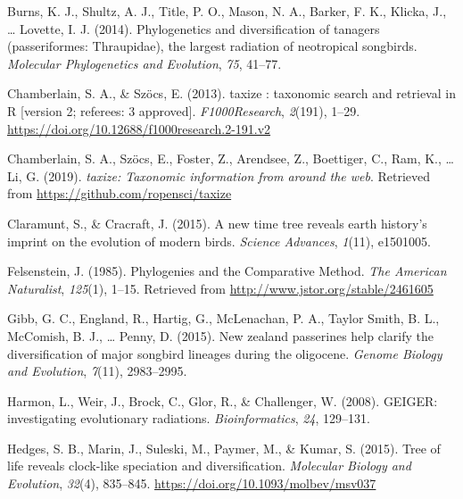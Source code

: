 \documentclass[
  english,
  man]{apa6}
\newlength{\cslhangindent}
\newlength{\cslentryspacingunit} %
\newenvironment{CSLReferences}[2] %
 {%
  \setlength{\parindent}{0pt}
  \ifodd #1
  \let\oldpar\par
  \def\par{\hangindent=\cslhangindent\oldpar}
  \fi
  \setlength{\parskip}{#2\cslentryspacingunit}
 }%
 {}
\begin{document}
\begin{CSLReferences}{1}{0}
\leavevmode{}%
Burns, K. J., Shultz, A. J., Title, P. O., Mason, N. A., Barker, F. K., Klicka, J., \ldots{} Lovette, I. J. (2014). Phylogenetics and diversification of tanagers (passeriformes: Thraupidae), the largest radiation of neotropical songbirds. \emph{Molecular Phylogenetics and Evolution}, \emph{75}, 41--77.

\leavevmode{}%
Chamberlain, S. A., \& Szöcs, E. (2013). {taxize : taxonomic search and retrieval in R {[}version 2; referees: 3 approved{]}}. \emph{F1000Research}, \emph{2}(191), 1--29. \url{https://doi.org/10.12688/f1000research.2-191.v2}

\leavevmode{}%
Chamberlain, S. A., Szöcs, E., Foster, Z., Arendsee, Z., Boettiger, C., Ram, K., \ldots{} Li, G. (2019). \emph{{taxize: Taxonomic information from around the web}}. Retrieved from \url{https://github.com/ropensci/taxize}

\leavevmode{}%
Claramunt, S., \& Cracraft, J. (2015). A new time tree reveals earth history's imprint on the evolution of modern birds. \emph{Science Advances}, \emph{1}(11), e1501005.

\leavevmode{}%
Felsenstein, J. (1985). {Phylogenies and the Comparative Method}. \emph{The American Naturalist}, \emph{125}(1), 1--15. Retrieved from \url{http://www.jstor.org/stable/2461605}

\leavevmode{}%
Gibb, G. C., England, R., Hartig, G., McLenachan, P. A., Taylor Smith, B. L., McComish, B. J., \ldots{} Penny, D. (2015). New zealand passerines help clarify the diversification of major songbird lineages during the oligocene. \emph{Genome Biology and Evolution}, \emph{7}(11), 2983--2995.

\leavevmode{}%
Harmon, L., Weir, J., Brock, C., Glor, R., \& Challenger, W. (2008). {GEIGER: investigating evolutionary radiations}. \emph{Bioinformatics}, \emph{24}, 129--131.

\leavevmode{}%
Hedges, S. B., Marin, J., Suleski, M., Paymer, M., \& Kumar, S. (2015). {Tree of life reveals clock-like speciation and diversification}. \emph{Molecular Biology and Evolution}, \emph{32}(4), 835--845. \url{https://doi.org/10.1093/molbev/msv037}


\end{CSLReferences}
\end{document}
